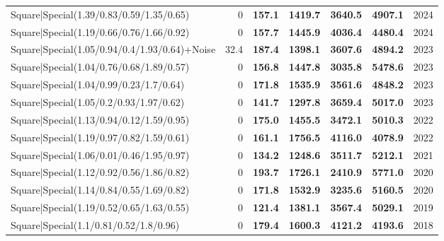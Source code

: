 \begin{tabular}{lrllllr}
 Square|Special(1.39/0.83/0.59/1.35/0.65)                      &             0   & \textbf{157.1} & \textbf{1419.7} & \textbf{3640.5} & \textbf{4907.1} &         2024 \\
 Square|Special(1.19/0.66/0.76/1.66/0.92)                      &             0   & \textbf{157.7} & \textbf{1445.9} & \textbf{4036.4} & \textbf{4480.4} &         2024 \\
 Square|Special(1.05/0.94/0.4/1.93/0.64)+Noise                 &            32.4 & \textbf{187.4} & \textbf{1398.1} & \textbf{3607.6} & \textbf{4894.2} &         2023 \\
 Square|Special(1.04/0.76/0.68/1.89/0.57)                      &             0   & \textbf{156.8} & \textbf{1447.8} & \textbf{3035.8} & \textbf{5478.6} &         2023 \\
 Square|Special(1.04/0.99/0.23/1.7/0.64)                       &             0   & \textbf{171.8} & \textbf{1535.9} & \textbf{3561.6} & \textbf{4848.2} &         2023 \\
 Square|Special(1.05/0.2/0.93/1.97/0.62)                       &             0   & \textbf{141.7} & \textbf{1297.8} & \textbf{3659.4} & \textbf{5017.0} &         2023 \\
 Square|Special(1.13/0.94/0.12/1.59/0.95)                      &             0   & \textbf{175.0} & \textbf{1455.5} & \textbf{3472.1} & \textbf{5010.3} &         2022 \\
 Square|Special(1.19/0.97/0.82/1.59/0.61)                      &             0   & \textbf{161.1} & \textbf{1756.5} & \textbf{4116.0} & \textbf{4078.9} &         2022 \\
 Square|Special(1.06/0.01/0.46/1.95/0.97)                      &             0   & \textbf{134.2} & \textbf{1248.6} & \textbf{3511.7} & \textbf{5212.1} &         2021 \\
 Square|Special(1.12/0.92/0.56/1.86/0.82)                      &             0   & \textbf{193.7} & \textbf{1726.1} & \textbf{2410.9} & \textbf{5771.0} &         2020 \\
 Square|Special(1.14/0.84/0.55/1.69/0.82)                      &             0   & \textbf{171.8} & \textbf{1532.9} & \textbf{3235.6} & \textbf{5160.5} &         2020 \\
 Square|Special(1.19/0.52/0.65/1.63/0.55)                      &             0   & \textbf{121.4} & \textbf{1381.1} & \textbf{3567.4} & \textbf{5029.1} &         2019 \\
 Square|Special(1.1/0.81/0.52/1.8/0.96)                        &             0   & \textbf{179.4} & \textbf{1600.3} & \textbf{4121.2} & \textbf{4193.6} &         2018 \\

\end{tabular}
